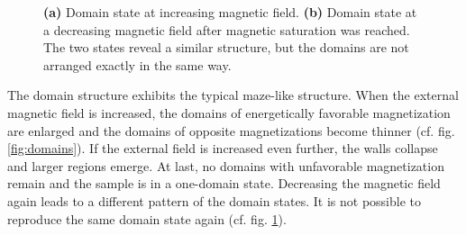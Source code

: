 \documentclass[a4paper]{scrartcl}
\numberwithin{equation}{section}
\numberwithin{figure}{section}
\numberwithin{table}{section}
\begin{document}
\begin{figure} 
 \centering
{} \hfill
{} 
\caption{ \small \textbf{(a)} Domain state at increasing magnetic field. \textbf{(b)} Domain state at a decreasing magnetic field after magnetic saturation was reached. The two states reveal a similar structure, but the domains are not arranged exactly in the same way.
  } 
	\label{fig:reaufbau}
\end{figure}






The domain structure exhibits the typical maze-like structure. When the external magnetic field is increased, the domains of energetically favorable magnetization are enlarged and the domains of opposite magnetizations become thinner (cf. fig. \ref{fig:domains}). If the external field is increased even further, the walls collapse and larger regions emerge. At last, no domains with unfavorable magnetization remain and the sample is in a one-domain state. Decreasing the magnetic field again leads to a different pattern of the domain states. It is not possible to reproduce the same domain state again (cf. fig. \ref{fig:reaufbau}).
\end{document}
